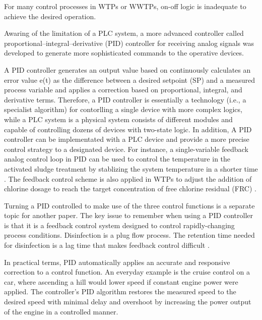 For many control processes in WTPs or WWTPs, on-off logic is inadequate to achieve the desired operation. 

Awaring of the limitation of a PLC system, a more advanced controller called proportional–integral–derivative (PID) controller for receiving analog signals was developed to generate more sophisticated commands to the operative devices.

A PID controller generates an output value based on continuously calculates an error value e(t) as the difference between a desired setpoint (SP) and a measured process variable and applies a correction based on proportional, integral, and derivative terms. Therefore, a PID controller is essentially a technology (i.e., a specialist algorithm) for contorlling a single device with more complex logics, while a PLC system is a physical system consists of different modules and capable of controlling dozens of devices with two-state logic. In addition, A PID controller can be implementated with a PLC device and provide a more precise control strategy to a designated device. For instance, a single-variable feedback analog control loop in PID can be used to control the temperature in the activated sludge treatment by stablizing the system temperature in a shorter time \cite{badosDesignPIDControl2020}. The feedback control scheme is also applied in WTPs to adjust the addition of chlorine dosage to reach the target concentration of free chlorine residual (FRC) \cite{wangCompositeControlPostChlorine2019}.


Turning a PID controlled to make use of the three control functions is a separate topic for another paper. The key issue to remember when using a PID controller is that it is a feedback control system designed to control rapidly-changing process conditions. Disinfection is a plug flow process. The retention time needed for disinfection is a lag time that makes feedback control difficult \cite{kobylinskiLineControlStrategies2006}.

In practical terms, PID automatically applies an accurate and responsive correction to a control function. An everyday example is the cruise control on a car, where ascending a hill would lower speed if constant engine power were applied. The controller's PID algorithm restores the measured speed to the desired speed with minimal delay and overshoot by increasing the power output of the engine in a controlled manner.

